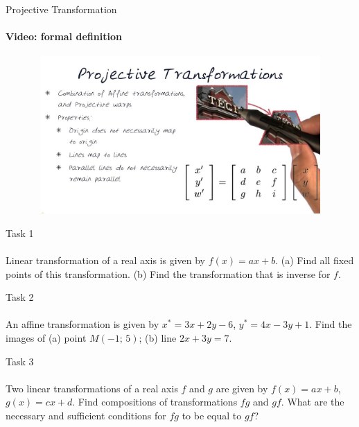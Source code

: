 \documentclass[aspectratio=169]{beamer}
\begin{document}
    \begin{frame}[t]{Projective Transformation}
        \framesubtitle{Video: formal definition}
        \vspace{-0.6cm}
        \begin{figure}[H]
            \href{https://www.youtube.com/watch?v=uyYKPUZg3og}{
                \centering\includegraphics[height=6cm,width=1\textwidth,keepaspectratio]{proj_def.jpg}}
            \label{fig:proj_def.jpg}
        \end{figure}
    \end{frame}
    

\begin{frame}[t]{Task 1}
    \framesubtitle{}
    Linear transformation of a real axis is given by $f(x)=ax+b$. (a) Find all fixed points of this transformation. (b) Find the transformation that is inverse for $f$.

\end{frame}

\begin{frame}[t]{Task 2}
    \framesubtitle{}
    An affine transformation is given by $x^*=3x+2y-6$, $y^*=4x-3y+1$. Find the images of (a) point $M(-1;\,5)$; (b) line $2x+3y=7$.

\end{frame}


\begin{frame}[t]{Task 3}
    \framesubtitle{}
    Two linear transformations of a real axis $f$ and $g$ are given by $f(x)=ax+b$, $g(x)=cx+d$. Find compositions of transformations $fg$ and $gf$. What are the necessary and sufficient conditions for $fg$ to be equal to $gf$?
    
\end{frame}
\end{document}
